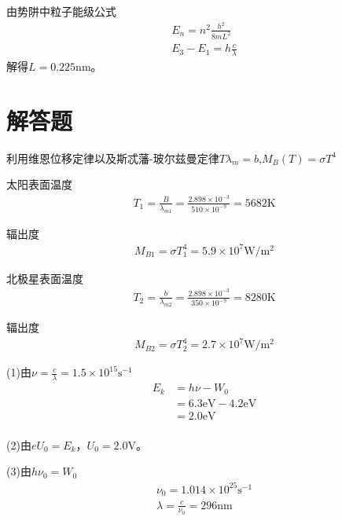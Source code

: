 
\solve 由势阱中粒子能级公式
\begin{gather*}
	E_n=n^2\frac{h^2}{8mL^2}\\
	E_3-E_1=h\frac{c}{\lambda}
\end{gather*}
解得$L=0.225\mathrm{nm}$。

\section{解答题}

\exercise

\solve 利用维恩位移定律以及斯忒藩-玻尔兹曼定律$T\lambda_m=b$,$M_B(T)=\sigma T^4$

太阳表面温度 
\begin{gather*}T_1=\frac{B}{\lambda_{m1}}=\frac{2.898\times10^{-3}}{510\times10^{-9}}=5682\mathrm{K}\end{gather*}

辐出度
\begin{gather*}M_{B1}=\sigma T_1^4=5.9\times10^7\mathrm{W/m^2}\end{gather*}

北极星表面温度
\begin{gather*} T_2=\frac{b}{\lambda_{m2}}=\frac{2.898\times10^{-3}}{350\times10^{-9}}=8280\mathrm{K}\end{gather*}

辐出度
\begin{gather*}M_{B2}=\sigma T_2^4=2.7\times10^7\mathrm{W/m^2}\end{gather*}

\exercise

\solve (1)由$\nu=\frac{c}{\lambda}=1.5\times10^{15}\mathrm{s^{-1}}$
\begin{equation*}
\begin{split}
E_k&=h\nu-W_0\\
&=6.3\mathrm{eV}-4.2\mathrm{eV}\\
&=2.0\mathrm{eV}\\
\end{split}
\end{equation*}

(2)由$eU_0=E_k$，$U_0=2.0\mathrm{V}$。

(3)由$h\nu_0=W_0$
\begin{gather*}
	\nu_0=1.014\times10^{25} \mathrm{s^{-1}}\\
	\lambda=\frac{c}{\nu_0}=296\mathrm{nm} 
\end{gather*}


